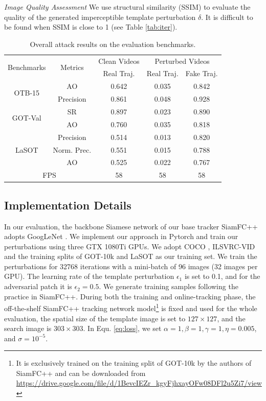 \documentclass[journal]{IEEEtran}
\begin{document}
\textit{Image Quality Assessment} We use structural similarity (SSIM) \cite{SSIM} to evaluate the quality of the generated imperceptible template perturbation $\delta$. It is difficult to be found when SSIM is close to 1 (see Table \ref{tab:iter}).

\begin{table}
\centering
\caption{Overall attack results on the evaluation benchmarks.}
\begin{tabular}{c c | c | c | c}
\toprule
\multirow{2}{*}[-2pt]{Benchmarks} & \multirow{2}{*}[-2pt]{Metrics} & Clean Videos    & \multicolumn{2}{c}{Perturbed Videos}  \\
\cmidrule{3-5}
                          &                         & Real Traj. & Real Traj. & Fake Traj.     \\ 
\midrule
\multirow{2}{*}{OTB-15} 
& AO   & 0.642 & 0.035 & 0.842\\
& Precision & 0.861 & 0.048 & 0.928\\
\midrule
\multirow{2}{*}{GOT-Val} 
& SR & 0.897 & 0.023 & 0.890\\
& AO 				   & 0.760 & 0.035 & 0.818 \\
\midrule
\multirow{3}{*}{LaSOT} 
& Precision       & 0.514 & 0.013 & 0.820\\
& Norm. Prec. & 0.551 & 0.015 & 0.788\\
& AO & 0.525 & 0.022 & 0.767\\
\midrule
\multicolumn{2}{c|}{FPS} & 58 & 58 & 58\\
\bottomrule
\end{tabular}
\label{tab:benchmark results}
\end{table}

\subsection{Implementation Details}

In our evaluation, the backbone Siamese network of our base tracker SiamFC++ \cite{SiamFC++} adopts GoogLeNet \cite{GoogLeNet}.
We implement our approach in Pytorch and train our perturbations using three GTX 1080Ti GPUs.
We adopt COCO \cite{COCO}, ILSVRC-VID \cite{VID} and the training splits of GOT-10k \cite{GOT-10k} and LaSOT \cite{LaSOT} as our training set.
We train the perturbations for 32768 iterations with a mini-batch of 96 images (32 images per GPU).
The learning rate of the template perturbation $\epsilon_1$ is set to 0.1, and for the adversarial patch it is $\epsilon_2 = 0.5$.
We generate training samples following the practice in SiamFC++.
During both the training and online-tracking phase, the off-the-shelf SiamFC++ tracking network model\footnote{It is exclusively trained on the training split of GOT-10k by the authors of SiamFC++ and can be downloaded from \url{https://drive.google.com/file/d/1BevcIEZr_kgyFjhxayOFw08DFl2u5Zi7/view}} is fixed and used for the whole evaluation, the spatial size of the template image is set to $127\times 127$, and the search image is $303\times 303$.
In Equ. \ref{eq:loss}, we set $\alpha=1, \beta=1, \gamma=1, \eta=0.005$, and $\sigma=10^{-5}$.
\end{document}

